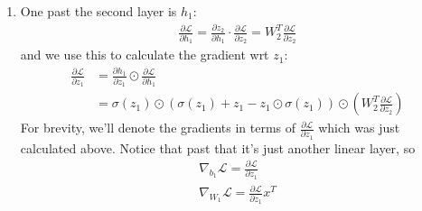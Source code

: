 \documentclass[12pt]{article}
\newcommand{\loss}{\mathcal{L}}
\begin{document}
\begin{enumerate}[label=(\alph*)]
    \item One past the second layer is $h_1$:
          \begin{gather*}
              \frac{\partial \loss}{\partial h_1}
              = \frac{\partial z_2}{\partial h_1} \cdot \frac{\partial \loss}{\partial z_2}
              = W_2^T \frac{\partial \loss}{\partial z_2}
          \end{gather*}
          and we use this to calculate the gradient wrt $z_1$:
          \begin{align*}
              \frac{\partial \loss}{\partial z_1}
               & = \frac{\partial h_1}{\partial z_1} \odot \frac{\partial \loss}{\partial h_1}                                                   \\
               & =\boxed{\sigma(z_1) \odot (\sigma(z_1)+z_1-z_1 \odot \sigma(z_1)) \odot \left(W_2^T \frac{\partial \loss}{\partial z_2}\right)}
          \end{align*}
          For brevity, we'll denote the gradients in terms of $\frac{\partial \loss}{\partial z_1}$
          which was just calculated above.
          Notice that past that it's just another linear layer, so
          \begin{gather*}
              \nabla_{b_1} \loss = \boxed{\frac{\partial \loss}{\partial z_1}} \\
              \nabla_{W_1} \loss = \boxed{\frac{\partial \loss}{\partial z_1}x^T} \\
          \end{gather*}
\end{enumerate}
\end{document}
